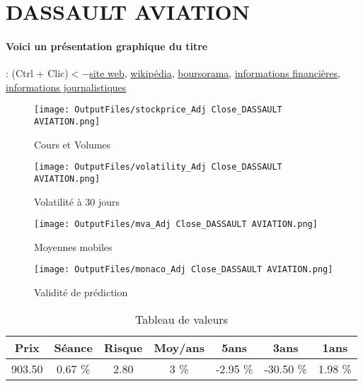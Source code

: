 \documentclass[11pt,a4paper]{report}%
\begin{document}
\newpage

\section{DASSAULT AVIATION}

\paragraph{Voici un présentation graphique du titre} : (Ctrl + Clic)$<-$\href{https://www.dassault-aviation.com/fr/groupe/finance/}{site web}, \href{https://fr.wikipedia.org/wiki/Danone}{wikipédia}, \href{https://www.boursorama.com/cours/1rPAM}{boursorama}, \href{https://www.qwant.com/?q=site:https:%2f%2fwww.easybourse.com%2faction-societe%2fDASSAULT-AVIATION&t=web&client=ext-firefox-hp}{informations financières}, \href{https://bourse.lerevenu.com/cours-de-bourse/fiche-valeur-synthese/DASSAULT-AVIATION/AM-FR}{informations journalistiques}
\begin{figure}[!htb]
   \begin{minipage}{0.5\textwidth}
     \centering
     \texttt{[image: OutputFiles/stockprice\_Adj Close\_DASSAULT AVIATION.png]}
     \caption{Cours et Volumes}\label{Fig:price_DASSAULT AVIATION}
   \end{minipage}\hfill
   \begin{minipage}{0.5\textwidth}
     \centering
     \texttt{[image: OutputFiles/volatility\_Adj Close\_DASSAULT AVIATION.png]}
     \caption{Volatilité à 30 jours}\label{Fig:volat_DASSAULT AVIATION}
   \end{minipage}
\end{figure}
\begin{figure}[!htb]
   \begin{minipage}{0.5\textwidth}
     \centering
     \texttt{[image: OutputFiles/mva\_Adj Close\_DASSAULT AVIATION.png]}
     \caption{Moyennes mobiles}\label{Fig:mva_DASSAULT AVIATION}
   \end{minipage}\hfill
   \begin{minipage}{0.5\textwidth}
     \centering
     \texttt{[image: OutputFiles/monaco\_Adj Close\_DASSAULT AVIATION.png]}
     \caption{Validité de prédiction}\label{Fig:prediction_DASSAULT AVIATION}
   \end{minipage}
\end{figure}

\begin{table}[H]
  \centering
    \begin{tabular}{|c|c|c|c|c|c|c|}
    \hline
    Prix & Séance & Risque  & Moy/ans & 5ans & 3ans & 1ans \\
    \hline
    903.50 &    0.67 \%    & 2.80 & 3 \% & -2.95 \% & -30.50 \% & 1.98 \% \\
    \hline
    \end{tabular}%
        \label{tab:table_DASSAULT AVIATION}%
      \caption{Tableau de valeurs}
\end{table}%
\end{document}
